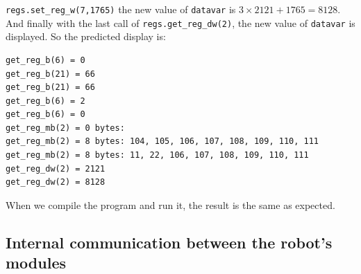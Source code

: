\documentclass[11pt]{article}
\begin{document}
\texttt{regs.set\_reg\_w(7,1765)} the new value of \texttt{datavar} is ${3\times2121 + 1765 = 8128}$. And finally with the last call of \texttt{regs.get\_reg\_dw(2)}, the new value of \texttt{datavar} is displayed. So the predicted display is:


\begin{verbatim}
get_reg_b(6) = 0
get_reg_b(21) = 66
get_reg_b(21) = 66
get_reg_b(6) = 2
get_reg_b(6) = 0
get_reg_mb(2) = 0 bytes:
get_reg_mb(2) = 8 bytes: 104, 105, 106, 107, 108, 109, 110, 111
get_reg_mb(2) = 8 bytes: 11, 22, 106, 107, 108, 109, 110, 111
get_reg_dw(2) = 2121
get_reg_dw(2) = 8128
\end{verbatim}

When we compile the program and run it, the result is the same as expected.

\subsection{Internal communication between the robot's modules}
\end{document}
